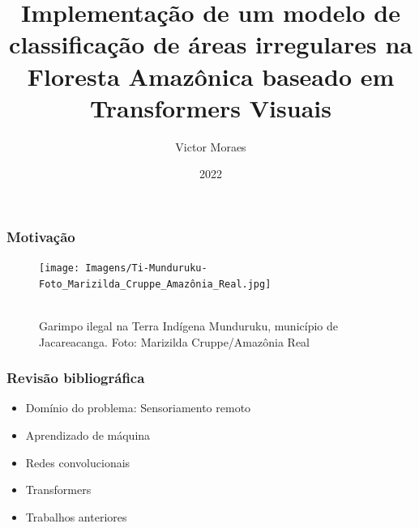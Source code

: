 \documentclass{beamer}
\title{Implementação de um modelo de classificação de áreas irregulares na Floresta Amazônica baseado em Transformers Visuais}
\author{Victor Moraes}
\institute{UFMG}
\date{2022}
\begin{document}
\frame{\titlepage}

\begin{frame}
\frametitle{Motivação}  

    \begin{figure}[!h]
    \centering
    \texttt{[image: Imagens/Ti-Munduruku-Foto\_Marizilda\_Cruppe\_Amazônia\_Real.jpg]}
    \caption[width=0.2\columnwidth]{\\\small Garimpo ilegal na Terra Indígena Munduruku, município de Jacareacanga. Foto: Marizilda Cruppe/Amazônia Real}
    \label{fig:garimpo}
    \end{figure}


\end{frame}


\begin{frame}
    \frametitle{Revisão bibliográfica }
\begin{itemize}
    \item Domínio do problema: Sensoriamento remoto
    \item Aprendizado de máquina
    \item Redes convolucionais
    \item Transformers
    \item Trabalhos anteriores
\end{itemize}

\end{frame}
\end{document}
